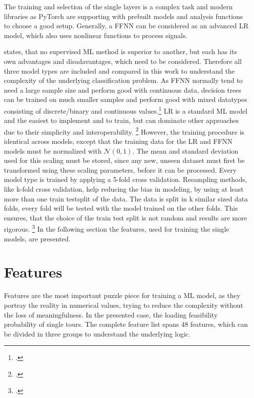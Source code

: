 

The training and selection of the single layers is a complex task
and modern libraries as PyTorch are supporting with prebuilt models and analysis functions to choose
a good setup. Generally, a \gls{FFNN} can be considered as an advanced \gls{LR} model,
which also uses nonlinear functions to process signals.

\parbreak
\cite{kotsiantis_supervised_2007} states, that no supervised \gls{ML} method is superior to another,
but each has its own advantages and disadavantages, which need to be considered.
Therefore all three model types are included and compared in this work
to understand the complexity of the underlying classification problem. As \gls{FFNN} normally
tend to need a large sample size and perform good with continuous data, decision trees can be
trained on much smaller samples and perform good with mixed datatypes consisting of discrete/binary
and continuous values.\footcite[cf.][pp. 262--264]{kotsiantis_supervised_2007}
\gls{LR} is a standard \gls{ML} model and the easiest to implement and to train, but can dominate
other approaches due to their simplicity and interoperability. \footcite[cf.][p. 8]{kirasich_random_2018}
However, the training procedure is identical across models, except that the training data for the \gls{LR} and \gls{FFNN}
models must be normalized with $\mathcal{N}(0,1)$. The mean and standard deviation used
for this scaling must be stored, since any new, unseen dataset must first be transformed
using these scaling parameters, before it can be processed. Every model type is trained by applying a 5-fold cross validation.
Resampling methods, like k-fold cross validation, help reducing the bias in modeling, by using at least more than one train testsplit of the data.
The data is split in k similar sized data folds, every fold will be tested with the model trained on the other folds.
This ensures, that the choice of the train test split is not random and results are more rigorous. \footcite[cf.][pp. 69--72]{kuhn_applied_2016}
In the following section the features, used for training the single models, are presented.


\section{Features}
\label{sec:Features}

Features are the most important puzzle piece for training a \gls{ML} model, as they portray the reality in numerical values, trying to
reduce the complexity without the loss of meaningfulness. In the presented case, the loading feasibility probability of single tours.
The complete feature list spans 48 features, which can be divided in three groups to understand the underlying logic.


